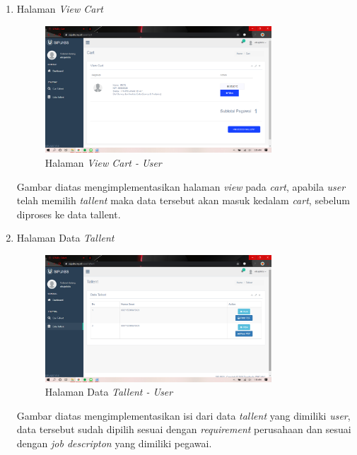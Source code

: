 \begin{enumerate}
	\newpage
	\item Halaman \textit{View Cart}
	\begin{figure}
		\centering
		\includegraphics[width=0.8\textwidth]
		{pics/user/implementasi/viewcart.png}
		\caption{Halaman \textit{View Cart - User}}
		\label{fig:CC10}
	\end{figure}
	
	Gambar diatas mengimplementasikan halaman \textit{view }pada \textit{cart}, apabila \textit{user} telah memilih \textit{tallent} maka data tersebut akan masuk kedalam \textit{cart}, sebelum diproses ke data tallent. 
	
		\item Halaman Data \textit{Tallent}
	\begin{figure}
		\centering
		\includegraphics[width=0.8\textwidth]
		{pics/user/implementasi/datatallent.png}
		\caption{Halaman Data \textit{Tallent - User}}
		\label{fig:CC10}
	\end{figure}
	
	Gambar diatas mengimplementasikan isi dari  data \textit{tallent} yang dimiliki \textit{user}, data tersebut sudah dipilih sesuai dengan \textit{requirement} perusahaan dan sesuai dengan \textit{job descripton} yang dimiliki pegawai.
	
\end{enumerate}


